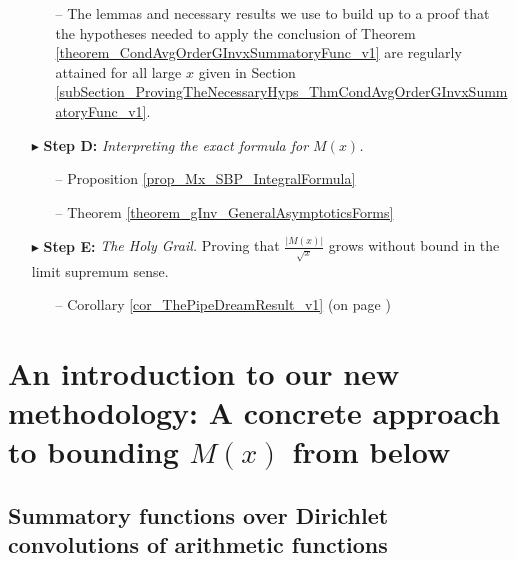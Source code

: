 \documentclass[11pt,reqno,a4letter]{article}
\numberwithin{figure}{section}
\numberwithin{table}{section}
\theoremstyle{plain}
\numberwithin{theorem}{section}
\theoremstyle{definition}
\begin{document}
\begin{itemize}[noitemsep,topsep=0pt,leftmargin=0.95in]
\begin{itemize}[noitemsep,topsep=0pt,leftmargin=0.35in]
     \item[--] \small{The lemmas and necessary results we use to build up to a proof that the 
                      hypotheses needed to apply the conclusion of 
                      Theorem \ref{theorem_CondAvgOrderGInvxSummatoryFunc_v1} are 
                      regularly attained for all large $x$ given in 
                      Section \ref{subSection_ProvingTheNecessaryHyps_ThmCondAvgOrderGInvxSummatoryFunc_v1}. } 
     \end{itemize} 
\item[$\blacktriangleright$ \textbf{Step D:}] \textit{Interpreting the exact formula for $M(x)$. } 
     \begin{itemize}[noitemsep,topsep=0pt,leftmargin=0.35in]
     \item[--] \small{Proposition \ref{prop_Mx_SBP_IntegralFormula}} 
     \item[--] \small{Theorem \ref{theorem_gInv_GeneralAsymptoticsForms}} 
     \end{itemize} 
\item[$\blacktriangleright$ \textbf{Step E:}] \textit{The Holy Grail. } 
     Proving that 
     $\frac{|M(x)|}{\sqrt{x}}$ grows without bound in the limit supremum sense. 
     \begin{itemize}[noitemsep,topsep=0pt,leftmargin=0.35in]
     \item[--] \small{Corollary \ref{cor_ThePipeDreamResult_v1} (on page \pageref{proofOf_cor_ThePipeDreamResult_v1})} 
     \end{itemize} 

\end{itemize} 

\newpage 
\section{An introduction to our new methodology: A concrete approach to bounding $M(x)$ from below} 

\subsection{Summatory functions over Dirichlet convolutions of arithmetic functions} 
\end{document}
